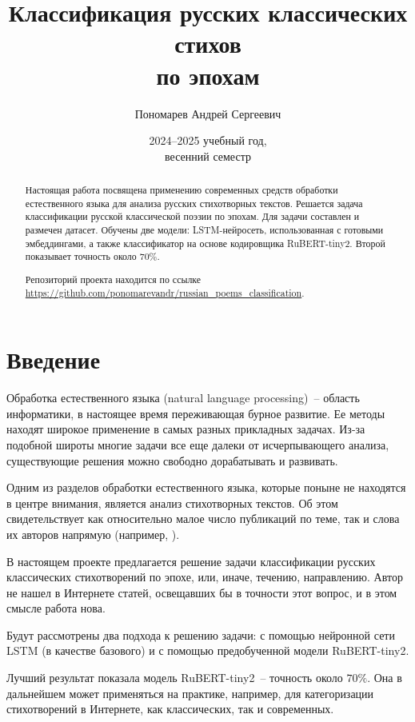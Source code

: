 \documentclass[a4paper,12pt]{article}
\title{Классификация русских классических стихов \\ по эпохам}
\author{Пономарев Андрей Сергеевич}
\date{2024--2025 учебный год, \\ весенний семестр}
\begin{document}
\maketitle

\begin{abstract}
    Настоящая работа посвящена применению современных средств обработки естественного языка для анализа русских стихотворных текстов. Решается задача классификации русской классической поэзии по эпохам. Для задачи составлен и размечен датасет. Обучены две модели: LSTM-нейросеть, использованная с готовыми эмбеддингами, а также классификатор на основе кодировщика RuBERT-tiny2. Второй показывает точность около $70 \%$.

    Репозиторий проекта находится по ссылке \\
    \url{https://github.com/ponomarevandr/russian_poems_classification}.
\end{abstract}



\section{Введение}

Обработка естественного языка (natural language processing)~-- область информатики, в настоящее время переживающая бурное развитие. Ее методы находят широкое применение в самых разных прикладных задачах. Из-за подобной широты многие задачи все еще далеки от исчерпывающего анализа, существующие решения можно свободно дорабатывать и развивать.

Одним из разделов обработки естественного языка, которые поныне не находятся в центре внимания, является анализ стихотворных текстов. Об этом свидетельствует как относительно малое число публикаций по теме, так и слова их авторов напрямую (например, \cite{barbado2021}).

В настоящем проекте предлагается решение задачи классификации русских классических стихотворений по эпохе, или, иначе, течению, направлению. Автор не нашел в Интернете статей, освещавших бы в точности этот вопрос, и в этом смысле работа нова.

Будут рассмотрены два подхода к решению задачи: с помощью нейронной сети LSTM (в качестве базового) и с помощью предобученной модели RuBERT-tiny2.

Лучший результат показала модель RuBERT-tiny2~-- точность около $70 \%$. Она в дальнейшем может применяться на практике, например, для категоризации стихотворений в Интернете, как классических, так и современных.
\end{document}
